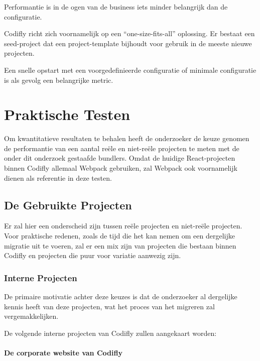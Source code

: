 Performantie is in de ogen van de business iets minder belangrijk dan de configuratie.


Codifly richt zich voornamelijk op een ``one-size-fits-all'' oplossing. Er bestaat een seed-project dat een project-template bijhoudt voor gebruik in de meeste nieuwe projecten.

Een snelle opstart met een voorgedefinieerde configuratie of minimale configuratie is als gevolg een belangrijke metric.

\section{Praktische Testen}

Om kwantitatieve resultaten te behalen heeft de onderzoeker de keuze genomen de performantie van een aantal reële en niet-reële projecten te meten met de onder dit onderzoek gestaafde bundlers. Omdat de huidige React-projecten binnen Codifly allemaal Webpack gebruiken, zal Webpack ook voornamelijk dienen als referentie in deze testen.

\subsection{De Gebruikte Projecten}

Er zal hier een onderscheid zijn tussen reële projecten en niet-reële projecten. Voor praktische redenen, zoals de tijd die het kan nemen om een dergelijke migratie uit te voeren, zal er een mix zijn van projecten die bestaan binnen Codifly en projecten die puur voor variatie aanwezig zijn.

\subsubsection{Interne Projecten}

De primaire motivatie achter deze keuzes is dat de onderzoeker al dergelijke kennis heeft van deze projecten, wat het proces van het migreren zal vergemakkelijken.

De volgende interne projecten van Codifly zullen aangekaart worden:

\paragraph{De corporate website van Codifly}

